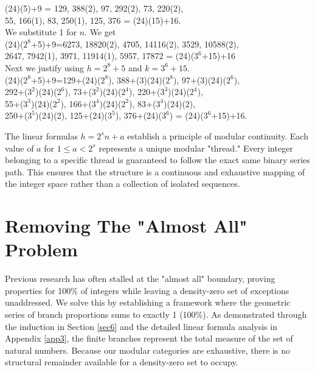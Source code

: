 \documentclass[sn-mathphys-num, pdflatex]{sn-jnl}
\begin{document}
(24)(5)+9 = 129, 388(2), 97, 292(2), 73, 220(2), \\

55, 166(1), 83, 250(1), 125, 376 = (24)(15)+16. \\

We substitute 1 for $n$. We get \\

(24)($2^8$+5)+9=6273, 18820(2), 4705, 14116(2), 3529, 10588(2), \\

2647, 7942(1), 3971, 11914(1), 5957, 17872 = (24)($3^6$+15)+16 \\

Next we justify using $h = 2^8+5$ and $k=3^6+15$. \\

(24)($2^8$+5)+9=129+(24)($2^8$), 388+(3)(24)($2^8$), 97+(3)(24)($2^6$),\\

292+($3^2$)(24)($2^6$), 73+($3^2$)(24)($2^4$), 220+($3^3$)(24)($2^4$),\\

55+($3^3$)(24)($2^2$), 166+($3^4$)(24)($2^2$), 83+($3^4$)(24)(2),\\ 

250+($3^5$)(24)(2), 125+(24)($3^5$), 376+(24)($3^6$) = (24)($3^6$+15)+16.

The linear formulas $h = 2^s n + a$ establish a principle of modular continuity. Each value of $a$ for $1 \le a < 2^s$ represents a unique modular "thread." Every integer belonging to a specific thread is guaranteed to follow the exact same binary series path. This ensures that the structure is a continuous and exhaustive mapping of the integer space rather than a collection of isolated sequences.
\section{Removing The "Almost All" Problem}\label{sec5}
Previous research has often stalled at the "almost all" boundary, proving properties for 100\% of integers while leaving a density-zero set of exceptions unaddressed. We solve this by establishing a framework where the geometric series of branch proportions sums to exactly 1 (100\%). As demonstrated through the induction in Section \ref{sec6} and the detailed linear formula analysis in Appendix \ref{app3}, the finite branches represent the total measure of the set of natural numbers. Because our modular categories are exhaustive, there is no structural remainder available for a density-zero set to occupy.
\end{document}
